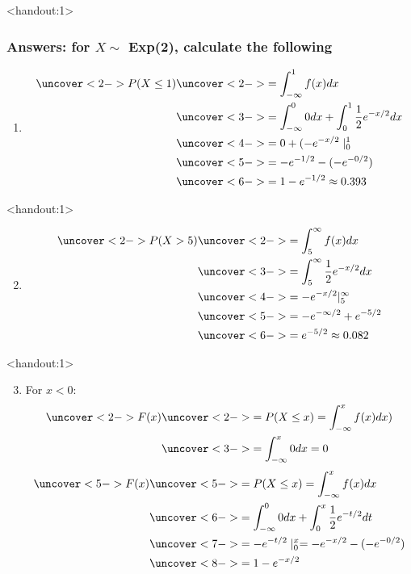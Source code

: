 \documentclass[handout]{beamer}\usepackage{graphicx, color}
\newcommand{\answers}{1}
\numberwithin{equation}{section}
\begin{document}
\begin{frame}<handout:\answers>
\frametitle{Answers: for $X \sim $ Exp(2), calculate the following}
\begin{enumerate}[1. ]
\item \begin{align*}
\uncover<2->{P(X \le 1)} &\uncover<2->{= \int_{-\infty}^1 f(x) dx} \\
&\uncover<3->{= \int_{-\infty}^0 0 dx +  \int_0^1 \frac{1}{2} e^{-x/2} dx} \\
&\uncover<4->{= 0 + ( -e^{-x/2}\mid_{0}^1} \\
&\uncover<5->{=  -e^{-1/2} - (-  e^{-0/2})} \\
&\uncover<6->{= 1 - e^{-1/2} \approx 0.393}
\end{align*}
\end{enumerate}
\end{frame}

\begin{frame}<handout:\answers>
\begin{enumerate}[1. ]
\setcounter{enumi}{1}
\item \begin{align*}
\uncover<2->{P(X > 5)} & \uncover<2->{= \int_5^\infty f(x) dx} \\
&\uncover<3->{= \int_5 ^\infty \frac{1}{2}e^{-x/2} dx} \\
&\uncover<4->{= -e^{-x/2}|_5^\infty} \\
&\uncover<5->{= -e^{-\infty/2} + e^{-5/2}} \\
&\uncover<6->{= e^{-5/2} \approx 0.082}
\end{align*}
\end{enumerate}
\end{frame}

\begin{frame}<handout:\answers>
\begin{enumerate}[1. ]
\setcounter{enumi}{2}
\item For $x < 0$:
\begin{align*}
\uncover<2->{F(x)} &\uncover<2->{= P(X \le x) = \int_{-\infty}^x f(x) dx)} \\
&\uncover<3->{ = \int_{-\infty}^x 0 dx = 0}
\end{align*}
\begin{align*}
\uncover<5->{F(x)} & \uncover<5->{= P(X \le x) = \int_{-\infty}^x f(x)dx} \\
&\uncover<6->{= \int_{-\infty}^0 0 dx + \int_{0}^x \frac{1}{2}e^{-t/2} dt} \\
&\uncover<7->{= -e^{-t/2}\mid_0^x = -e^{-x/2} - (-e^{-0/2})} \\
& \uncover<8->{= 1 - e^{-x/2}}
\end{align*}
\end{enumerate}
\end{frame}
\end{document}
